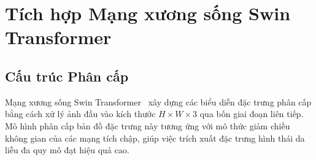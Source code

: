 \documentclass[11pt]{article}
\begin{document}
\section{Tích hợp Mạng xương sống Swin Transformer}\label{sec:swin}

\subsection{Cấu trúc Phân cấp}\label{subsec:swin_arch}

Mạng xương sống Swin Transformer~\cite{liu2021swin} xây dựng các biểu diễn đặc trưng phân cấp bằng cách xử lý ảnh đầu vào kích thước $H \times W \times 3$ qua bốn giai đoạn liên tiếp. Mô hình phân cấp bản đồ đặc trưng này tương ứng với mô thức giảm chiều không gian của các mạng tích chập, giúp việc trích xuất đặc trưng hình thái da liễu đa quy mô đạt hiệu quả cao.
\end{document}
